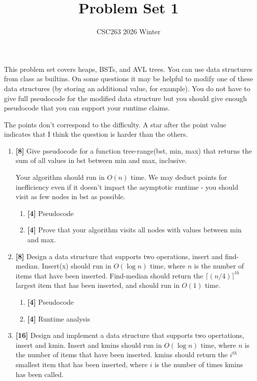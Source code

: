 \documentclass{article}
\title{Problem Set 1}
\date{CSC263 2026 Winter}
\begin{document}
This problem set covers heaps, BSTs, and AVL trees.  You can use data structures from class as builtins. On some questions it may be helpful to modify one of these data structures (by storing an additional value, for example). You do not have to give full pseudocode for the modified data structure but you should give enough pseudocode that you can support your runtime claims. 

The points don't correspond to the difficulty. A star after the point value indicates that I think the question is harder than the others.
\begin{enumerate}

	\item \textbf{[8]} Give pseudocode for a function tree-range(bst, min, max) that returns the sum of all values in bst between min and max, inclusive. 

		Your algorithm should run in $O(n)$ time. We may deduct points for inefficiency even if it doesn't impact the asymptotic runtime - you should visit as few nodes in bst as possible.

		\begin{enumerate}
			\item \textbf{[4]} Pseudocode
			\item \textbf{[4]} Prove that your algorithm visits all nodes with values between min and max.
		\end{enumerate}

	\item \textbf{[8]} Design a data structure that supports two operations, insert and find-median. Insert(x) should run in $O(\log n)$ time, where $n$ is the number of items that have been inserted. Find-median should return the $\lceil(n/4)\rceil^{th}$ largest item that has been inserted, and should run in $O(1)$ time.

	\begin{enumerate}
		\item \textbf{[4]} Pseudocode
		\item \textbf{[4]} Runtime analysis
	\end{enumerate}

\item \textbf{[16]} Design and implement a data structure that supports two opertations, insert and kmin. 
	Insert and kmins should run in $O(\log n)$ time, where $n$ is the number of items that have been inserted.  kmins should return the $i^{th}$ smallest item that has been inserted, where $i$ is the number of times kmins has been called. 


\end{enumerate}
\end{document}
